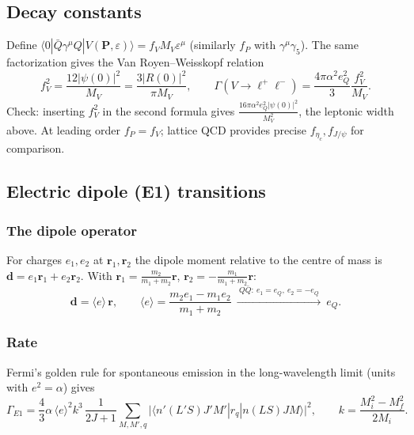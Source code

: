 \documentclass[11pt,a4paper]{article}
\numberwithin{equation}{section}
\theoremstyle{definition}
\theoremstyle{plain}
\theoremstyle{remark}
\numberwithin{algorithm}{section}
\newcommand{\vr}{\bm r}
\begin{document}
\subsection{Decay constants}
Define $\langle0|\bar Q\gamma^\mu Q|V(\bm P,\varepsilon)\rangle=f_VM_V\varepsilon^\mu$ (similarly $f_P$ with $\gamma^\mu\gamma_5$). The same factorization gives the Van Royen--Weisskopf relation
\begin{equation}
f_V^2=\frac{12|\psi(0)|^2}{M_V}=\frac{3|R(0)|^2}{\pi M_V},\qquad
\Gamma(V\to\ell^+\ell^-)=\frac{4\pi\alpha^2e_Q^2}{3}\frac{f_V^2}{M_V}.
\end{equation}
Check: inserting $f_V^2$ in the second formula gives $\frac{16\pi\alpha^2e_Q^2|\psi(0)|^2}{M_V^2}$, the leptonic width above. At leading order $f_P=f_V$; lattice QCD provides precise $f_{\eta_c},f_{J/\psi}$ for comparison.

\subsection{Electric dipole (E1) transitions}
\subsubsection{The dipole operator}
For charges $e_1,e_2$ at $\vr_1,\vr_2$ the dipole moment relative to the centre of mass is $\bm d=e_1\vr_1+e_2\vr_2$. With $\vr_1=\frac{m_2}{m_1+m_2}\vr$, $\vr_2=-\frac{m_1}{m_1+m_2}\vr$:
\begin{equation}
\bm d=\langle e\rangle\,\vr,\qquad \langle e\rangle=\frac{m_2e_1-m_1e_2}{m_1+m_2}\ \xrightarrow{\ Q\bar Q:\ e_1=e_Q,\ e_2=-e_Q\ }\ e_Q .
\end{equation}
\subsubsection{Rate}
Fermi's golden rule for spontaneous emission in the long-wavelength limit (units with $e^2=\alpha$) gives
\begin{equation}
\Gamma_{E1}=\frac43\alpha\,\langle e\rangle^2k^3\,\frac{1}{2J+1}\sum_{M,M',q}\big|\langle n'(L'S)J'M'|r_q|n(LS)JM\rangle\big|^2,\qquad k=\frac{M_i^2-M_f^2}{2M_i}.
\end{equation}
\end{document}
